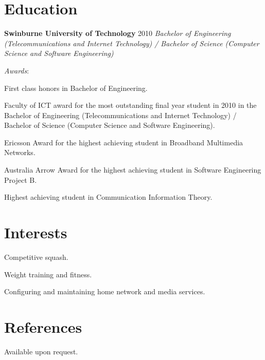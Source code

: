 \documentclass[line,margin]{res}
\begin{document}
\begin{resume}
        \section{Education} \textbf{Swinburne University of Technology} \hfill 2010
        \textit{Bachelor of Engineering (Telecommunications and Internet Technology) / Bachelor of Science (Computer Science and Software Engineering)}

        \textit{Awards}:
        \begin{list}{}{\leftmargin=1em \itemsep=-2pt}
            \item{First class honors in Bachelor of Engineering.}
            \item{Faculty of ICT award for the most outstanding final year student in 2010 in the Bachelor of Engineering (Telecommunications and Internet Technology) / Bachelor of Science (Computer Science and Software Engineering).}
            \item{Ericsson Award for the highest achieving student in Broadband Multimedia Networks.}
            \item{Australia Arrow Award for the highest achieving student in Software Engineering Project B.}
            \item{Highest achieving student in Communication Information Theory.}
        \end{list}

        \section{Interests}
        \begin{list}{}{\leftmargin=1em \itemsep=-2pt}
            \item{Competitive squash.}
            \item{Weight training and fitness.}
            \item{Configuring and maintaining home network and media services.}
        \end{list}

        \section{References}
        Available upon request.
    \end{resume}
\end{document}

